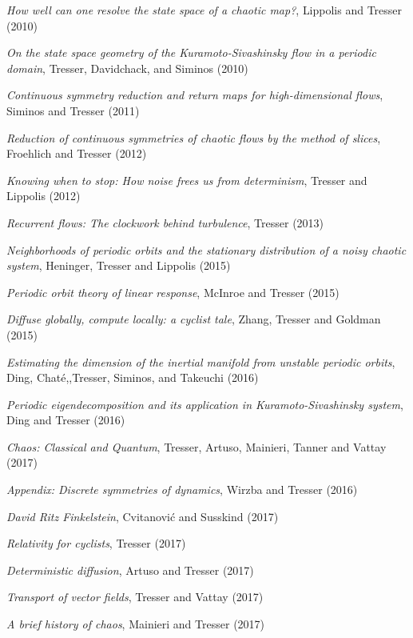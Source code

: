 {{
{\em How well can one resolve the state space of a chaotic map?},
{Lippolis and Tresser}
{(2010)}

{\em On the state space geometry of the {Kuramoto-Sivashinsky} flow in a periodic domain},
{Tresser, Davidchack, and Siminos}
{(2010)}

{\em Continuous symmetry reduction and return maps for high-dimensional flows},
{Siminos and Tresser}
{(2011)}

{\em Reduction of continuous symmetries of chaotic flows by the method of
slices},
{Froehlich and Tresser}
{(2012)}

{\em Knowing when to stop: {How} noise frees us from determinism},
{Tresser and Lippolis}
{(2012)}

{\em Recurrent flows: {The} clockwork behind turbulence},
{Tresser}
{(2013)}

{\em Neighborhoods of periodic orbits and the stationary distribution of
a noisy chaotic system},
{Heninger, Tresser and Lippolis}
{(2015)}

{\em Periodic orbit theory of linear response},
{McInroe and Tresser}
{(2015)}

{\em Diffuse globally, compute locally: a cyclist tale},
{Zhang, Tresser and Goldman}
{(2015)}

{\em Estimating the dimension of the inertial manifold from unstable
periodic orbits},
{Ding, Chat\'e,,Tresser, Siminos, and Takeuchi}
{(2016)}

{\em Periodic eigendecomposition and its application in
{Kuramoto-Sivashinsky} system},
{Ding and Tresser}
{(2016)}

 {\em Chaos: {Classical and Quantum}},
{Tresser, Artuso, Mainieri, Tanner and Vattay}
{(2017)}

{\em Appendix: {Discrete} symmetries of dynamics},
{Wirzba and Tresser}
{(2016)}

{\em {David Ritz Finkelstein}},
{Cvitanovi{\'{c}} and Susskind}
{(2017)}

{\em Relativity for cyclists},
{Tresser}
{(2017)}

{\em Deterministic diffusion},
{Artuso and Tresser}
{(2017)}

{\em Transport of vector fields},
{Tresser and Vattay}
{(2017)}

{\em A brief history of chaos},
{Mainieri and Tresser}
{(2017)}

}}
